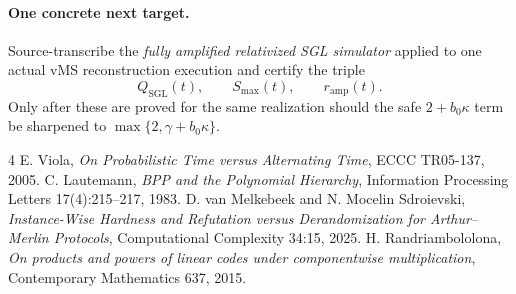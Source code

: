 \documentclass[11pt]{article}
\begin{document}
\paragraph{One concrete next target.}
Source-transcribe the \emph{fully amplified relativized SGL simulator} applied to one actual vMS reconstruction execution and certify the triple
\[
\boxed{
Q_{\mathrm{SGL}}(t),\qquad
S_{\max}(t),\qquad
r_{\mathrm{amp}}(t).
}
\]
Only after these are proved for the same realization should the safe \(2+b_0\kappa\) term be sharpened to \(\max\{2,\gamma+b_0\kappa\}\).

\begin{thebibliography}{4}
E. Viola, \emph{On Probabilistic Time versus Alternating Time}, ECCC TR05-137, 2005.
C. Lautemann, \emph{BPP and the Polynomial Hierarchy}, Information Processing Letters 17(4):215--217, 1983.
D. van Melkebeek and N. Mocelin Sdroievski, \emph{Instance-Wise Hardness and Refutation versus Derandomization for Arthur--Merlin Protocols}, Computational Complexity 34:15, 2025.
H. Randriambololona, \emph{On products and powers of linear codes under componentwise multiplication}, Contemporary Mathematics 637, 2015.
\end{thebibliography}
\end{document}
